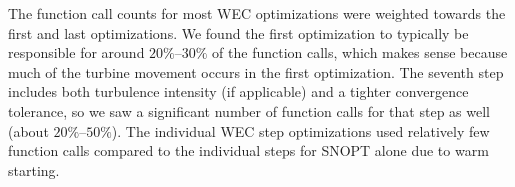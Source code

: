 \documentclass[hidelinks,sort&compress,AMA,STIX1COL]{WileyNJD-v2}
\begin{document}
The function call counts for most WEC optimizations were weighted towards the first and last optimizations. We found the first optimization to typically be responsible for around $20\%$--$30\%$ of the function calls, which makes sense because much of the turbine movement occurs in the first optimization. The seventh step includes both turbulence intensity (if applicable) and a tighter convergence tolerance, so we saw a significant number of function calls for that step as well (about $20\%$--$50\%$). The individual WEC step optimizations used relatively few function calls compared to the individual steps for SNOPT alone due to warm starting. 

%
%
\end{document}
